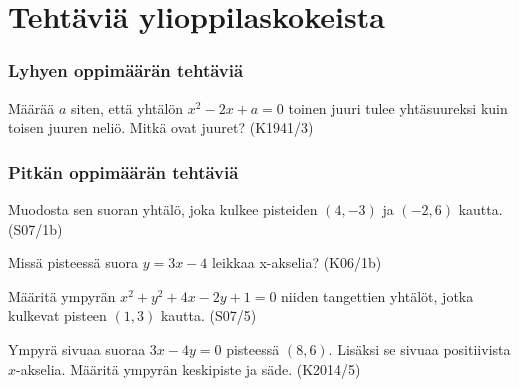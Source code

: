 \section{Tehtäviä ylioppilaskokeista}


\subsubsection*{Lyhyen oppimäärän tehtäviä}

\begin{tehtava}
Määrää $a$ siten, että yhtälön $x^2-2x+a=0$ toinen juuri tulee yhtäsuureksi kuin toisen juuren neliö. Mitkä ovat juuret? (K1941/3)
\end{tehtava}

\subsubsection*{Pitkän oppimäärän tehtäviä}

\begin{tehtava}
	Muodosta sen suoran yhtälö, joka kulkee pisteiden $(4, -3)$ ja $(-2,6)$ kautta. (S07/1b)
\end{tehtava}

\begin{tehtava}
	Missä pisteessä suora $y=3x-4$ leikkaa x-akselia? (K06/1b)
\end{tehtava}

\begin{tehtava}
	Määritä ympyrän $x^2+y^2+4x-2y+1=0$ niiden tangettien yhtälöt, jotka kulkevat pisteen $(1,3)$ kautta. (S07/5)
\end{tehtava}



\begin{tehtava}
Ympyrä sivuaa suoraa $3x-4y=0$ pisteessä $(8,6)$. Lisäksi se sivuaa positiivista $x$-akselia.
Määritä ympyrän keskipiste ja säde. (K2014/5)
\end{tehtava}


